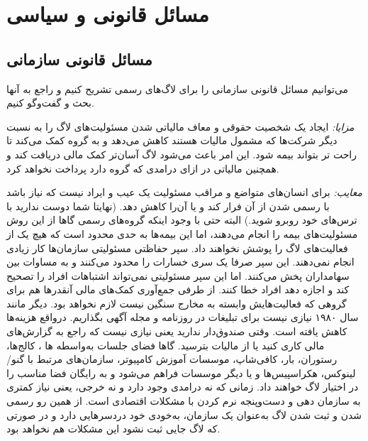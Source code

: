 \section{مسائل قانونی و سیاسی}

\subsection{مسائل قانونی سازمانی}

می‌توانیم مسائل قانونی سازمانی را برای لاگ‌های رسمی تشریح کنیم و راجع
به آنها بحث و گفت‌وگو کنیم.

{\itshape مزایا:}
ایجاد یک شخصیت حقوقی و معاف مالیاتی شدن مسئولیت‌های لاگ
را به نسبت دیگر شرکت‌ها که مشمول مالیات هستند کاهش می‌دهد و به گروه
کمک می‌کند تا راحت تر بتواند بیمه شود. این امر باعث می‌شود لاگ آسان‌تر
کمک مالی دریافت کند و همچنین مالیاتی در ازای درامدی که گروه دارد
پرداخت نخواهد کرد.

{\itshape معایب:}
برای انسان‌های متواضع و مراقب مسئولیت یک عیب و ایراد نیست که نیاز باشد
با رسمی شدن از آن فرار کند و یا آن‌را کاهش دهد.
(نهایتا شما دوست ندارید با ترس‌های خود روبرو شوید.)
البته حتی با وجود اینکه گروه‌های رسمی گاها از این روش مسئولیت‌های بیمه
را انجام می‌دهند، اما این بیمه‌ها به حدی محدود است که هیچ یک از فعالیت‌های
لاگ را پوشش نخواهند داد.
سپر حفاظتی مسئولیتی سازمان‌ها کار زیادی انجام نمی‌دهند. این سپر صرفا
یک سری خسارات را محدود می‌کنند و به مساوات بین سهامداران پخش می‌کنند.
اما این سپر مسئولیتی نمی‌تواند اشتباهات افراد را تصحیح کند و اجازه دهد
افراد خطا کنند.
از طرفی جمع‌آوری کمک‌های مالی آنقدر‌ها هم برای گروهی که فعالیت‌هایش وابسته به
مخارج سنگین نیست لازم نخواهد بود. دیگر مانند سال ۱۹۸۰ نیازی نیست برای تبلیغات
در روزنامه و مجله آگهی بگذاریم. درواقع هزینه‌ها کاهش یافته است.
وقتی صندوق‌دار ندارید یعنی نیازی نیست که راجع به گزارش‌های مالی کاری کنید یا
از مالیات بترسید.
گاها فضای جلسات به‌واسطه
ها
، کالج‌ها، رستوران، بار، کافی‌شاپ، موسسات آموزش کامپیوتر،
سازمان‌های مرتبط با گنو/لینوکس، هکراسپیس‌ها و یا دیگر موسسات فراهم می‌شود و به رایگان
فضا مناسب را در اختیار لاگ خواهند داد.
زمانی که نه درامدی وجود دارد و نه خرجی، یعنی نیاز کمتری به سازمان دهی و دست‌وپنجه
نرم کردن با مشکلات اقتصادی است.
از همین رو رسمی شدن و ثبت شدن لاگ به‌عنوان یک سازمان، به‌خودی خود دردسر‌هایی دارد
و در صورتی که لاگ جایی ثبت نشود این مشکلات هم نخواهد بود.


